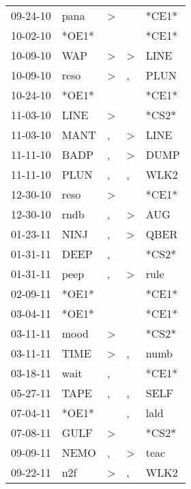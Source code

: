 \begin{supertabular}{lllll}
 09-24-10 &   pana &     \textgreater &                  &  *CE1* \\
 10-02-10 &  *OE1* &                  &                  &  *CE1* \\
 10-09-10 &    WAP &     \textgreater &     \textgreater &   LINE \\
 10-09-10 &   reso &     \textgreater &                , &   PLUN \\
 10-24-10 &  *OE1* &                  &                  &  *CE1* \\
 11-03-10 &   LINE &     \textgreater &                  &  *CS2* \\
 11-03-10 &   MANT &                , &     \textgreater &   LINE \\
 11-11-10 &   BADP &                , &     \textgreater &   DUMP \\
 11-11-10 &   PLUN &                , &                , &   WLK2 \\
 12-30-10 &   reso &     \textgreater &                  &  *CE1* \\
 12-30-10 &   rndb &                , &     \textgreater &    AUG \\
 01-23-11 &   NINJ &                , &     \textgreater &   QBER \\
 01-31-11 &   DEEP &                , &                  &  *CS2* \\
 01-31-11 &   peep &                , &     \textgreater &   rule \\
 02-09-11 &  *OE1* &                  &                  &  *CE1* \\
 03-04-11 &  *OE1* &                  &                  &  *CE1* \\
 03-11-11 &   mood &     \textgreater &                  &  *CS2* \\
 03-11-11 &   TIME &     \textgreater &                , &   numb \\
 03-18-11 &   wait &                , &                  &  *CE1* \\
 05-27-11 &   TAPE &                , &                , &   SELF \\
 07-04-11 &  *OE1* &                  &                , &   lald \\
 07-08-11 &   GULF &     \textgreater &                  &  *CS2* \\
 09-09-11 &   NEMO &                , &     \textgreater &   teac \\
 09-22-11 &    n2f &     \textgreater &                , &   WLK2 \\

\end{supertabular}
